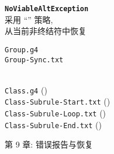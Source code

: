 \begin{frame}{}
  \begin{center}
    \texttt{\bf NoViableAltException} \\[20pt]

    \pause
    采用 ``'' 策略, \\[5pt]
    从当前非终结符中恢复

    \pause
    \vspace{1.00cm}
    \texttt{Group.g4} \\[15pt]
    \texttt{Group-Sync.txt}

    \pause
    \vspace{1.00cm}
  \end{center}
\end{frame}

\begin{frame}{}
  \begin{center}
     \\[20pt]

    \texttt{Class.g4} (\texttt{}) \\[20pt]
    \pause
    \texttt{Class-Subrule-Start.txt} () \\[10pt]
    \pause
    \texttt{Class-Subrule-Loop.txt} () \\[10pt]
    \pause
    \texttt{Class-Subrule-End.txt} ()
  \end{center}
\end{frame}

\begin{frame}{}

  \begin{center}
    第 9 章: 错误报告与恢复
  \end{center}
\end{frame}
